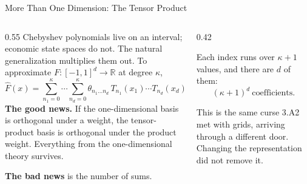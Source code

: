 \begin{frame}{More Than One Dimension: The Tensor Product}
\begin{columns}[T]
\begin{column}{0.55\textwidth}
\small
Chebyshev polynomials live on an interval; economic state spaces do not. The natural generalization multiplies them out. To approximate $F:[-1,1]^{d}\to\mathbb{R}$ at degree $\kappa$,
\[
  \hat{F}(x)=\sum_{n_1=0}^{\kappa}\cdots\sum_{n_d=0}^{\kappa}
  \theta_{n_1\dots n_d}\,T_{n_1}(x_1)\cdots T_{n_d}(x_d).
\]
\medskip
\textbf{The good news.} If the one-dimensional basis is orthogonal under a weight, the tensor-product basis is orthogonal under the product weight. Everything from the one-dimensional theory survives.
\medskip

\textbf{The bad news} is the number of sums.
\end{column}
\begin{column}{0.42\textwidth}
\begin{conceptbox}[title=\textbf{Count them}]\small
Each index runs over $\kappa+1$ values, and there are $d$ of them:
\[
  (\kappa+1)^{d}\ \text{coefficients.}
\]
\end{conceptbox}
\medskip
\begin{examplebox}\footnotesize
This is the same curse 3.A2 met with grids, arriving through a different door. Changing the representation did not remove it.
\end{examplebox}
\end{column}
\end{columns}
\vspace{1mm}
\end{frame}

